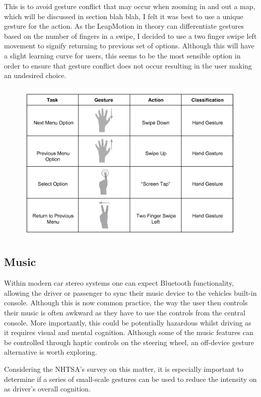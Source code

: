 \documentclass{l4proj}
\begin{document}
This is to avoid gesture conflict that may occur when zooming in and out a map, which will be discussed in section blah blah, I felt it was best to use a unique gesture for the action. As the LeapMotion in theory can differentiate gestures based on the number of fingers in a swipe, I decided to use a two finger swipe left movement to signify returning to previous set of options. Although this will have a slight learning curve for users, this seems to be the most sensible option in order to ensure that gesture conflict does not occur resulting in the user making an undesired choice.
\begin{figure}[h!]
\centering
\includegraphics[width=6in]{images/LeapMenuGesture.png}
\label{fig:leapmenu}
\end{figure}
\newpage

\subsection{Music}
\vspace{-3mm}
Within modern car stereo systems one can expect Bluetooth functionality, allowing the driver or passenger to sync their music device to the vehicles built-in console. Although this is now common practice, the way the user then controls their music is often awkward as they have to use the controls from the central console. More importantly, this could be potentially hazardous whilst driving as it requires visual and mental cognition. Although some of the music features can be controlled through haptic controls on the steering wheel, an off-device gesture alternative is worth exploring.

Considering the NHTSA's survey on this matter\cite{Royal}, it is especially important to determine if a series of small-scale gestures can be used to reduce the intensity on as driver's overall cognition. 
\end{document}
